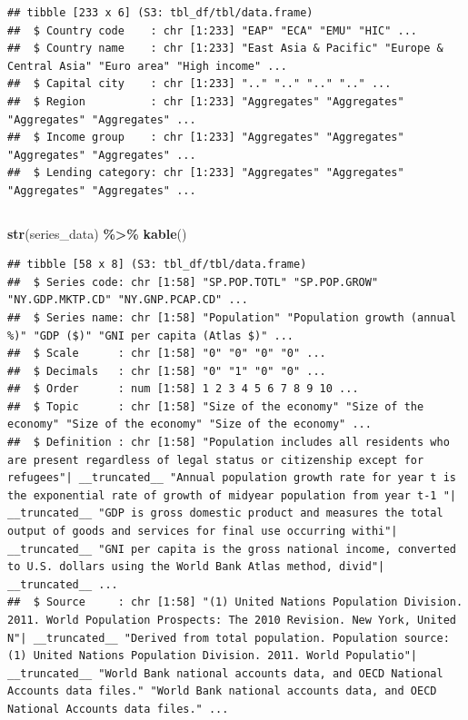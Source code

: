 \documentclass[
]{book}
\newenvironment{Shaded}{\begin{snugshade}}{\end{snugshade}}
\newcommand{\FunctionTok}[1]{\textcolor[rgb]{0.13,0.29,0.53}{\textbf{#1}}}
\newcommand{\NormalTok}[1]{#1}
\newcommand{\SpecialCharTok}[1]{\textcolor[rgb]{0.81,0.36,0.00}{\textbf{#1}}}
\begin{document}
\begin{verbatim}
## tibble [233 x 6] (S3: tbl_df/tbl/data.frame)
##  $ Country code    : chr [1:233] "EAP" "ECA" "EMU" "HIC" ...
##  $ Country name    : chr [1:233] "East Asia & Pacific" "Europe & Central Asia" "Euro area" "High income" ...
##  $ Capital city    : chr [1:233] ".." ".." ".." ".." ...
##  $ Region          : chr [1:233] "Aggregates" "Aggregates" "Aggregates" "Aggregates" ...
##  $ Income group    : chr [1:233] "Aggregates" "Aggregates" "Aggregates" "Aggregates" ...
##  $ Lending category: chr [1:233] "Aggregates" "Aggregates" "Aggregates" "Aggregates" ...
\end{verbatim}

\begin{tabular}{}
\hline

\hline
\end{tabular}

\begin{Shaded}
\begin{Highlighting}[]
\FunctionTok{str}\NormalTok{(series\_data) }\SpecialCharTok{\%\textgreater{}\%} \FunctionTok{kable}\NormalTok{()}
\end{Highlighting}
\end{Shaded}

\begin{verbatim}
## tibble [58 x 8] (S3: tbl_df/tbl/data.frame)
##  $ Series code: chr [1:58] "SP.POP.TOTL" "SP.POP.GROW" "NY.GDP.MKTP.CD" "NY.GNP.PCAP.CD" ...
##  $ Series name: chr [1:58] "Population" "Population growth (annual %)" "GDP ($)" "GNI per capita (Atlas $)" ...
##  $ Scale      : chr [1:58] "0" "0" "0" "0" ...
##  $ Decimals   : chr [1:58] "0" "1" "0" "0" ...
##  $ Order      : num [1:58] 1 2 3 4 5 6 7 8 9 10 ...
##  $ Topic      : chr [1:58] "Size of the economy" "Size of the economy" "Size of the economy" "Size of the economy" ...
##  $ Definition : chr [1:58] "Population includes all residents who are present regardless of legal status or citizenship except for refugees"| __truncated__ "Annual population growth rate for year t is the exponential rate of growth of midyear population from year t-1 "| __truncated__ "GDP is gross domestic product and measures the total output of goods and services for final use occurring withi"| __truncated__ "GNI per capita is the gross national income, converted to U.S. dollars using the World Bank Atlas method, divid"| __truncated__ ...
##  $ Source     : chr [1:58] "(1) United Nations Population Division. 2011. World Population Prospects: The 2010 Revision. New York, United N"| __truncated__ "Derived from total population. Population source: (1) United Nations Population Division. 2011. World Populatio"| __truncated__ "World Bank national accounts data, and OECD National Accounts data files." "World Bank national accounts data, and OECD National Accounts data files." ...
\end{verbatim}
\end{document}
